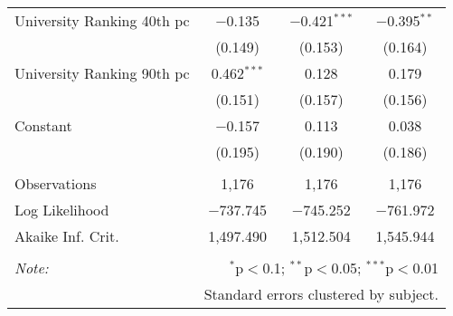\begin{table}[!htbp]
\begin{tabular}{@{\extracolsep{5pt}}lccc}
  University Ranking 40th pc & $-$0.135 & $-$0.421$^{***}$ & $-$0.395$^{**}$ \\ 
  & (0.149) & (0.153) & (0.164) \\ 
  University Ranking 90th pc & 0.462$^{***}$ & 0.128 & 0.179 \\ 
  & (0.151) & (0.157) & (0.156) \\ 
  Constant & $-$0.157 & 0.113 & 0.038 \\ 
  & (0.195) & (0.190) & (0.186) \\ 
 \hline \\[-1.8ex] 
Observations & 1,176 & 1,176 & 1,176 \\ 
Log Likelihood & $-$737.745 & $-$745.252 & $-$761.972 \\ 
Akaike Inf. Crit. & 1,497.490 & 1,512.504 & 1,545.944 \\ 
\hline 
\hline \\[-1.8ex] 
\textit{Note:}  & \multicolumn{3}{r}{$^{*}$p$<$0.1; $^{**}$p$<$0.05; $^{***}$p$<$0.01} \\ 
 & \multicolumn{3}{r}{Standard errors clustered by subject.} \\ 
\end{tabular} 
\end{table} 

